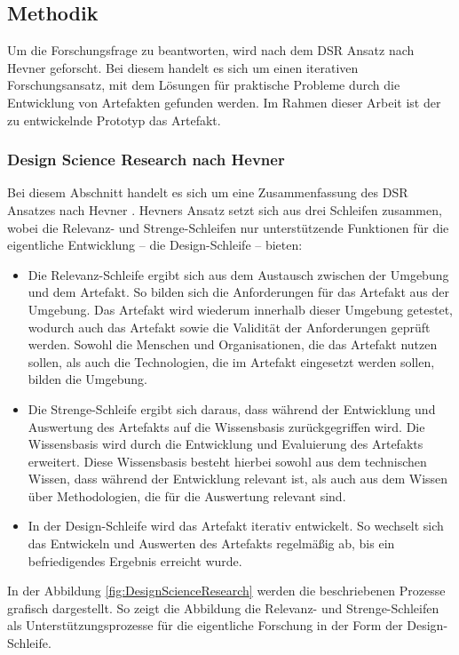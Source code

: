 \subsection{Methodik}
Um die Forschungsfrage zu beantworten, wird nach dem \ac{DSR} Ansatz nach Hevner \cite{Hevner2004} geforscht. Bei diesem handelt es sich um einen iterativen Forschungsansatz, mit dem Lösungen für praktische Probleme durch die Entwicklung von Artefakten gefunden werden. Im Rahmen dieser Arbeit ist der zu entwickelnde Prototyp das Artefakt.

\subsubsection{Design Science Research nach Hevner}
Bei diesem Abschnitt handelt es sich um eine Zusammenfassung des \ac{DSR} Ansatzes nach Hevner \cite[S.~79-81]{Hevner2004}. Hevners Ansatz setzt sich aus drei Schleifen zusammen, wobei die Relevanz- und Strenge-Schleifen nur unterstützende Funktionen für die eigentliche Entwicklung – die Design-Schleife – bieten:

\begin{itemize}
    \item Die Relevanz-Schleife ergibt sich aus dem Austausch zwischen der Umgebung und dem Artefakt. So bilden sich die Anforderungen für das Artefakt aus der Umgebung. Das Artefakt wird wiederum innerhalb dieser Umgebung getestet, wodurch auch das Artefakt sowie die Validität der Anforderungen geprüft werden. Sowohl die Menschen und Organisationen, die das Artefakt nutzen sollen, als auch die Technologien, die im Artefakt eingesetzt werden sollen, bilden die Umgebung.
    \item Die Strenge-Schleife ergibt sich daraus, dass während der Entwicklung und Auswertung des Artefakts auf die Wissensbasis zurückgegriffen wird. Die Wissensbasis wird durch die Entwicklung und Evaluierung des Artefakts erweitert. Diese Wissensbasis besteht hierbei sowohl aus dem technischen Wissen, dass während der Entwicklung relevant ist, als auch aus dem Wissen über Methodologien, die für die Auswertung relevant sind.
    \item In der Design-Schleife wird das Artefakt iterativ entwickelt. So wechselt sich das Entwickeln und Auswerten des Artefakts regelmäßig ab, bis ein befriedigendes Ergebnis erreicht wurde.
\end{itemize}

In der Abbildung \ref{fig:DesignScienceResearch} werden die beschriebenen Prozesse grafisch dargestellt. So zeigt die Abbildung die Relevanz- und Strenge-Schleifen als Unterstützungsprozesse für die eigentliche Forschung in der Form der Design-Schleife.

